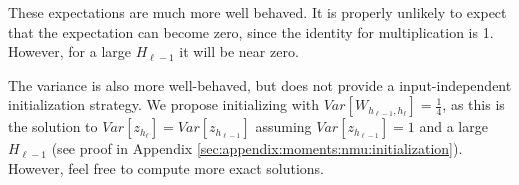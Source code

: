 These expectations are much more well behaved. It is properly unlikely to expect that the expectation can become zero, since the identity for multiplication is 1. However, for a large $H_{\ell-1}$ it will be near zero.

The variance is also more well-behaved, but does not provide a input-independent initialization strategy. We propose initializing with $Var[W_{h_{\ell-1},h_\ell}] = \frac{1}{4}$, as this is the solution to $Var[z_{h_\ell}] = Var[z_{h_{\ell-1}}]$ assuming $Var[z_{h_{\ell-1}}] = 1$ and a large $H_{\ell-1}$ (see proof in Appendix \ref{sec:appendix:moments:nmu:initialization}). However, feel free to compute more exact solutions.

